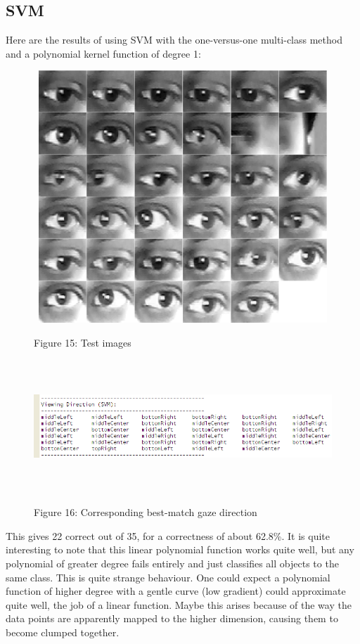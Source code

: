 \documentclass[12pt,letterpaper]{article}
\begin{document}
\subsection{SVM}
\label{scn:results-svm}

Here are the results of using SVM with the one-versus-one multi-class method and a polynomial kernel
function of degree 1:

\begin{figure}[h]
\centering
\includegraphics[width=120mm,height=95mm]{testImg3.png}

\small Figure 15: Test images
\end{figure}

\begin{figure}[h]
\centering
\includegraphics[width=170mm,height=50mm]{viewingDir4.png}

\small Figure 16: Corresponding best-match gaze direction
\end{figure}

This gives 22 correct out of 35, for a correctness of about 62.8\%. It is quite interesting to note that
this linear polynomial function works quite well, but any polynomial of greater degree fails entirely
and just classifies all objects to the same class. This is quite strange behaviour. One could expect a 
polynomial function of higher degree with a gentle curve (low gradient) could approximate quite well, the
job of a linear function. Maybe this arises because of the way the data points are apparently mapped
to the higher dimension, causing them to become clumped together.
\end{document}
